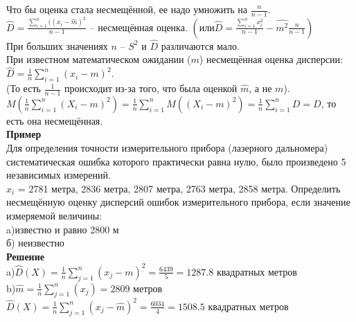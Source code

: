 \documentclass[russian, 12pt, fleqn]{article}
\begin{document}
Что бы оценка стала несмещённой, ее надо умножить на $\frac{n}{n - 1}$.\\
$\hat{D} = \frac{\displaystyle{\sum \limits _{i = 1}^{n}( (x_i - \hat{m})^2 }}{n - 1}$ -- несмещённая оценка. $ \displaystyle{\left ( или \hat{D} = \frac{\sum \limits _{i = 1}^{n} x_i^2}{n - 1} - \hat{m^2} \frac{n}{n - 1}\right )}$\\
При больших значениях $n$ -- $S^2$ и $\hat{D}$ различаются мало.\\ При известном математическом ожидании ($m$) несмещённая оценка дисперсии:$\hat{D} = \frac{1}{n} \displaystyle{\sum \limits_{i=1}^{n}(x_i - m)^2}$.\\ (То есть $\frac{1}{n - 1}$ происходит из-за того, что была оценкой $\hat{m}$, а не $m$).\\
$ \displaystyle{M \left( \frac{1}{n} \sum \limits_{i = 1}^{n} (X_i - m)^2 \right) = \frac{1}{n} \displaystyle{\sum \limits_{i = 1}^{n}} M((X_i - m)^2) = \frac{1}{n} \displaystyle{\sum \limits_{i = 1}^{n}}  D = D}$,
{то есть она несмещённая.}\\
\textbf{Пример}\\
Для определения точности измерительного прибора (лазерного дальномера) систематическая ошибка которого практически равна нулю, было произведено 5 независимых измерений.\\
$x_i$  = 2781 метра, 2836 метра, 2807 метра, 2763 метра, 2858 метра. Определить несмещённую оценку дисперсий ошибок  измерительного прибора, если значение измеряемой величины:\\
a)известно и равно 2800 м\\
б) неизвестно\\
\textbf{Решение}\\
a)$\hat{D}(X) = \frac{1}{n} \displaystyle{\sum \limits_{j = 1}^{n}}(x_j - m)^2 = \frac{6439}{5} = 1287.8$ квадратных метров\\
b)$\hat{m} = \frac{1}{n} \displaystyle{\sum \limits_{j = 1}^{n}}(x_j)= 2809$  метров\\
$\hat{D}(X) = \frac{1}{n} \displaystyle{\sum \limits_{j = 1}^{n}}(x_j - \hat{m})^2 = \frac{6034}{4} = 1508.5$ квадратных метров\\
\end{document}
